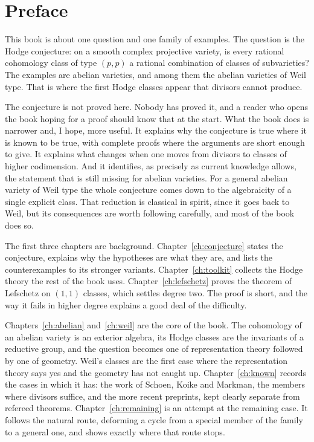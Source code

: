 \chapter*{Preface}

This book is about one question and one family of examples. The question is
the Hodge conjecture: on a smooth complex projective variety, is every
rational cohomology class of type $(p,p)$ a rational combination of classes
of subvarieties? The examples are abelian varieties, and among them the
abelian varieties of Weil type. That is where the first Hodge classes appear
that divisors cannot produce.

The conjecture is not proved here. Nobody has proved it, and a reader who
opens the book hoping for a proof should know that at the start. What the
book does is narrower and, I hope, more useful. It explains why the
conjecture is true where it is known to be true, with complete proofs where
the arguments are short enough to give. It explains what changes when one
moves from divisors to classes of higher codimension. And it identifies, as
precisely as current knowledge allows, the statement that is still missing
for abelian varieties. For a general abelian variety of Weil type the whole
conjecture comes down to the algebraicity of a single explicit class. That
reduction is classical in spirit, since it goes back to Weil, but its
consequences are worth following carefully, and most of the book does so.

The first three chapters are background. Chapter~\ref{ch:conjecture} states
the conjecture, explains why the hypotheses are what they are, and lists the
counterexamples to its stronger variants. Chapter~\ref{ch:toolkit} collects
the Hodge theory the rest of the book uses. Chapter~\ref{ch:lefschetz}
proves the theorem of Lefschetz on $(1,1)$ classes, which settles degree
two. The proof is short, and the way it fails in higher degree explains a
good deal of the difficulty.

Chapters~\ref{ch:abelian} and~\ref{ch:weil} are the core of the book. The
cohomology of an abelian variety is an exterior algebra, its Hodge classes
are the invariants of a reductive group, and the question becomes one of
representation theory followed by one of geometry. Weil's classes are the
first case where the representation theory says yes and the geometry has
not caught up. Chapter~\ref{ch:known} records the cases in which it has:
the work of Schoen, Koike and Markman, the members where divisors
suffice, and the more recent preprints, kept clearly separate from refereed
theorems. Chapter~\ref{ch:remaining} is an attempt at the
remaining case. It follows the natural route, deforming a cycle from a
special member of the family to a general one, and shows exactly where that
route stops.

